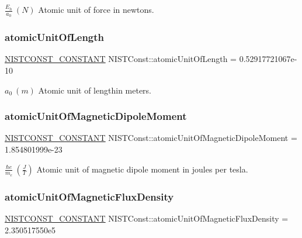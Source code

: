 $\frac{E_h}{a_0} \ (N)$ Atomic unit of force in newtons. \mbox{\label{group___n_i_s_t_const-_atomic_unit_ga2611c2902279953d3d6a18cfd1dfce3e}} 
\subsubsection{\texorpdfstring{atomic\+Unit\+Of\+Length}{atomicUnitOfLength}}
{\footnotesize\ttfamily \mbox{\hyperlink{_n_i_s_t_const_8hpp_a2b0fc1d7452373f816175dd86ce26729}{N\+I\+S\+T\+C\+O\+N\+S\+T\+\_\+\+C\+O\+N\+S\+T\+A\+NT}} N\+I\+S\+T\+Const\+::atomic\+Unit\+Of\+Length = 0.\+52917721067e-\/10}

$a_0 \ (m)$ Atomic unit of lengthin meters. \mbox{\label{group___n_i_s_t_const-_atomic_unit_gacc6b0608f4456d2fb880dc295b852433}} 
\subsubsection{\texorpdfstring{atomic\+Unit\+Of\+Magnetic\+Dipole\+Moment}{atomicUnitOfMagneticDipoleMoment}}
{\footnotesize\ttfamily \mbox{\hyperlink{_n_i_s_t_const_8hpp_a2b0fc1d7452373f816175dd86ce26729}{N\+I\+S\+T\+C\+O\+N\+S\+T\+\_\+\+C\+O\+N\+S\+T\+A\+NT}} N\+I\+S\+T\+Const\+::atomic\+Unit\+Of\+Magnetic\+Dipole\+Moment = 1.\+854801999e-\/23}

$\frac{\hbar e}{m_e} \ (\frac{J}{T})$ Atomic unit of magnetic dipole moment in joules per tesla. \mbox{\label{group___n_i_s_t_const-_atomic_unit_gafc19eaca8ac811b061e8630bd3203930}} 
\subsubsection{\texorpdfstring{atomic\+Unit\+Of\+Magnetic\+Flux\+Density}{atomicUnitOfMagneticFluxDensity}}
{\footnotesize\ttfamily \mbox{\hyperlink{_n_i_s_t_const_8hpp_a2b0fc1d7452373f816175dd86ce26729}{N\+I\+S\+T\+C\+O\+N\+S\+T\+\_\+\+C\+O\+N\+S\+T\+A\+NT}} N\+I\+S\+T\+Const\+::atomic\+Unit\+Of\+Magnetic\+Flux\+Density = 2.\+350517550e5}

